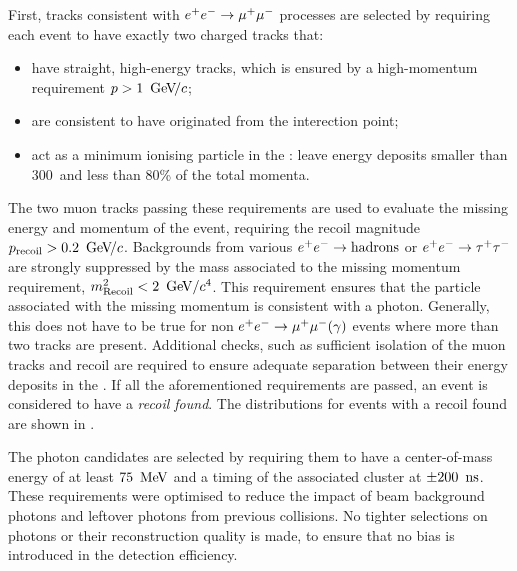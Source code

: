 First, tracks consistent with $e^+e^-\rightarrow\mu^+\mu^-$ processes are selected by requiring each event to have exactly two charged tracks that:
\begin{itemize}
    \item have straight, high-energy tracks, which is ensured by a high-momentum requirement $p>1~{\mathrm{\,Ge\kern -0.1em V\!/}c}$;
    \item are consistent to have originated from the interection point;
    \item act as a minimum ionising particle in the \ECL: leave energy deposits smaller than 300~\mev and less than 80\% of the total momenta.
\end{itemize}
The two muon tracks passing these requirements are used to evaluate the missing energy and momentum of the event, requiring the recoil magnitude $p_{\mathrm{recoil}}>0.2~{\mathrm{\,Ge\kern -0.1em V\!/}c}$.
Backgrounds from various $e^+e^-\rightarrow\mathrm{hadrons}$ or $e^+e^-\rightarrow\tau^+\tau^-$ are strongly suppressed by the mass associated to the missing momentum requirement,
$m^2_{\mathrm{Recoil}}<2~\mathrm{\,Ge\kern -0.1em V}/c^4$.
This requirement ensures that the particle associated with the missing momentum is consistent with a photon.
Generally, this does not have to be true for non $e^+e^-\rightarrow\mu^+\mu^-(\gamma)$ events where more than two tracks are present.
Additional checks, such as sufficient isolation of the muon tracks and recoil are required to ensure adequate separation between their energy deposits in the \ECL.
If all the aforementioned requirements are passed, an event is considered to have a \textit{recoil found}.
The distributions for events with a recoil found are shown in .

The photon candidates are selected by requiring them to have a center-of-mass energy of at least $75~\mathrm{\,Me\kern -0.1em V}$ and a timing of the associated cluster at $\pm200~{\rm \,ns}$.
These requirements were optimised to reduce the impact of beam background photons and leftover photons from previous collisions.
No tighter selections on photons or their reconstruction quality is made, to ensure that no bias is introduced in the detection efficiency.

